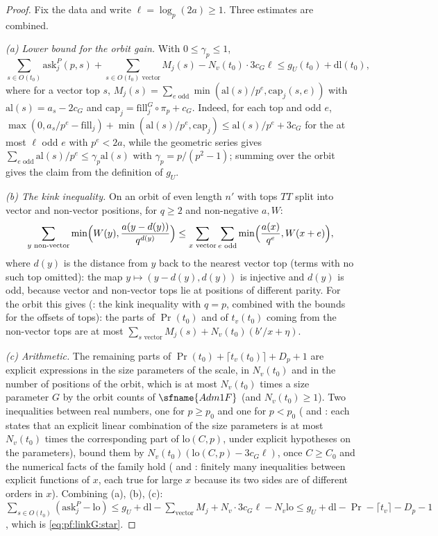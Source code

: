 \begin{proof}
Fix the data and write $\ell=\log_p(2a)\ge1$. Three estimates are combined.

\emph{(a) Lower bound for the orbit gain.} With $0\le\gamma_p\le1$,
\[
\sum_{s\in O(t_0)}\mathrm{ask}^P_j(p,s)+\sum_{s\in O(t_0)\text{ vector}}M_j(s)-N_v(t_0)\cdot3c_G\ell\le g_U(t_0)+\mathrm{dl}(t_0),
\]
where for a vector top $s$, $M_j(s)=\sum_{e\text{ odd}}\min(\mathrm{al}(s)/p^e,\mathrm{cap}_j(s,e))$ with $\mathrm{al}(s)=a_s-2c_G$ and
$\mathrm{cap}_j=\mathrm{fill}^G_j\circ\pi_p+c_G$. Indeed, for each top and odd $e$,
$\max(0,a_s/p^e-\mathrm{fill}_j)+\min(\mathrm{al}(s)/p^e,\mathrm{cap}_j)\le\mathrm{al}(s)/p^e+3c_G$ for the at most $\ell$ odd $e$ with
$p^e<2a$, while the geometric series gives $\sum_{e\text{ odd}}\mathrm{al}(s)/p^e\le\gamma_p\mathrm{al}(s)$ with
$\gamma_p=p/(p^2-1)$; summing over the orbit gives the claim from the definition of $g_U$.

\emph{(b) The kink inequality.} On an orbit of even length $n'$ with tops $TT$ split into vector and non-vector positions, for
$q\ge2$ and non-negative $a,W$:
\[
\sum_{y\text{ non-vector}}\min\Bigl(W(y),\frac{a(y-d(y))}{q^{d(y)}}\Bigr)\le\sum_{x\text{ vector}}\sum_{e\text{ odd}}\min\Bigl(\frac{a(x)}{q^e},W(x+e)\Bigr),
\]
where $d(y)$ is the distance from $y$ back to the nearest vector top (terms with no such top omitted): the map
$y\mapsto(y-d(y),d(y))$ is injective and $d(y)$ is odd, because vector and non-vector tops lie at positions of different
parity. For the orbit this gives
(: the kink inequality with $q=p$, combined with the bounds for the offsets
of tops): the parts of $\Pr(t_0)$ and of $t_v(t_0)$ coming from the non-vector tops are at most
$\sum_{s\text{ vector}}M_j(s)+N_v(t_0)(b'/x+\eta)$.

\emph{(c) Arithmetic.} The remaining parts of $\Pr(t_0)+\lceil t_v(t_0)\rceil+D_p+1$ are explicit expressions in the size
parameters of the scale, in $N_v(t_0)$ and in the number of positions of the orbit, which is at most $N_v(t_0)$ times a size
parameter $G$ by the orbit counts of $\sfname{Adm1F}$ (and $N_v(t_0)\ge1$). Two inequalities between real numbers, one for
$p\ge p_0$ and one for $p<p_0$ ( and :
each states that an explicit linear combination of the size parameters is at most $N_v(t_0)$ times the corresponding part of
$\mathrm{lo}(C,p)$, under explicit hypotheses on the parameters), bound them by $N_v(t_0)(\mathrm{lo}(C,p)-3c_G\ell)$, once $C\ge C_0$
and the numerical facts of the family hold
( and : finitely many
inequalities between explicit functions of $x$, each true for large $x$ because its two sides are of different orders in $x$).
Combining (a), (b), (c):
$\sum_{s\in O(t_0)}(\mathrm{ask}^P_j-\mathrm{lo})\le g_U+\mathrm{dl}-\sum_{\text{vector}}M_j+N_v\cdot3c_G\ell-N_v\mathrm{lo}\le
g_U+\mathrm{dl}-\Pr-\lceil t_v\rceil-D_p-1$, which is \eqref{eq:pf:linkG:star}.
\end{proof}

